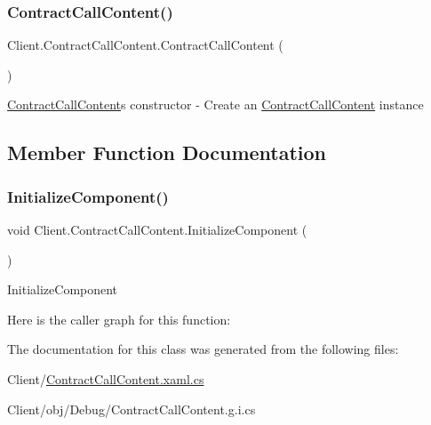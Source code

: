 \subsubsection{\texorpdfstring{Contract\+Call\+Content()}{ContractCallContent()}}
{\footnotesize\ttfamily Client.\+Contract\+Call\+Content.\+Contract\+Call\+Content (\begin{DoxyParamCaption}{ }\end{DoxyParamCaption})\hspace{0.3cm}{\ttfamily [inline]}}

\hyperlink{class_client_1_1_contract_call_content}{Contract\+Call\+Content}\textquotesingle{}s constructor -\/ Create an \hyperlink{class_client_1_1_contract_call_content}{Contract\+Call\+Content} instance 

\subsection{Member Function Documentation}
\mbox{\label{class_client_1_1_contract_call_content_aa232b31c78e95c3cb42a0a1c9f11e4e4}} 
\subsubsection{\texorpdfstring{Initialize\+Component()}{InitializeComponent()}}
{\footnotesize\ttfamily void Client.\+Contract\+Call\+Content.\+Initialize\+Component (\begin{DoxyParamCaption}{ }\end{DoxyParamCaption})\hspace{0.3cm}{\ttfamily [inline]}}



Initialize\+Component 

Here is the caller graph for this function\+:


The documentation for this class was generated from the following files\+:\begin{DoxyCompactItemize}
\item 
Client/\hyperlink{_contract_call_content_8xaml_8cs}{Contract\+Call\+Content.\+xaml.\+cs}\item 
Client/obj/\+Debug/Contract\+Call\+Content.\+g.\+i.\+cs\end{DoxyCompactItemize}
